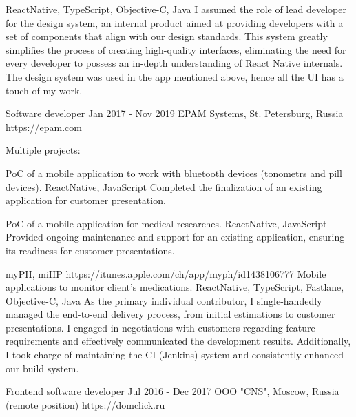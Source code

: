 \documentclass[11pt,a4paper,sans]{awesomecv}
\begin{document}
\begin{cventries}
{\begin{cvprojects}{0.8ex}
        {ReactNative, TypeScript, Objective-C, Java}
        {
          I assumed the role of lead developer for the design system, 
          an internal product aimed at providing developers with a set of 
          components that align with our design standards. 
          This system greatly simplifies the process of creating high-quality interfaces, 
          eliminating the need for every developer to possess an in-depth understanding of React Native internals.
          \hfill \break
          \hfill \break
          The design system was used in the app mentioned above, hence all the UI has a touch of my work.
        }
    \end{cvprojects}
    }
\cventry
    {Software developer}
    {Jan 2017 - Nov 2019}
    {EPAM Systems, St. Petersburg, Russia}
    {https://epam.com}
    {
      Multiple projects:\newline
      \begin{cvprojects}{0.8ex}
      \item \cvproject
          {PoC of a mobile application to work with bluetooth devices (tonometrs and pill devices).}
          {}{}
          {ReactNative, JavaScript}
          {Completed the finalization of an existing application for customer presentation.}
      \item \cvproject
          {PoC of a mobile application for medical researches.}
          {}{}
          {ReactNative, JavaScript}
          {Provided ongoing maintenance and support for an existing application, ensuring its readiness for customer presentations.}
      \item \cvproject
          {myPH, miHP}
          {https://itunes.apple.com/ch/app/myph/id1438106777}
          {Mobile applications to monitor client's medications.}
          {ReactNative, TypeScript, Fastlane, Objective-C, Java}
          {
            As the primary individual contributor, 
            I single-handedly managed the end-to-end delivery process, 
            from initial estimations to customer presentations. 
            I engaged in negotiations with customers regarding feature 
            requirements and effectively communicated the development results. 
            Additionally, I took charge of maintaining the CI (Jenkins) system 
            and consistently enhanced our build system.
          }
      \end{cvprojects}
    }
\cventry
    {Frontend software developer}
    {Jul 2016 - Dec 2017}
    {OOO "CNS", Moscow, Russia (remote position)}
    {https://domclick.ru}
    {
}
\end{cventries}
\end{document}
